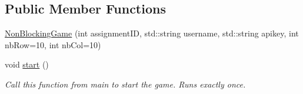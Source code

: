 \subsection*{Public Member Functions}
\begin{DoxyCompactItemize}
\item 
\hyperlink{classbridges_1_1game_1_1_non_blocking_game_a3226aa7e7ff129e916f4bd5aabcb2e72}{Non\+Blocking\+Game} (int assignment\+ID, std\+::string username, std\+::string apikey, int nb\+Row=10, int nb\+Col=10)
\item 
void \hyperlink{classbridges_1_1game_1_1_non_blocking_game_ab48a0d690368bb8ff7b02aad0b6f336e}{start} ()
\begin{DoxyCompactList}\small\item\em Call this function from main to start the game. Runs exactly once. \end{DoxyCompactList}\end{DoxyCompactItemize}
